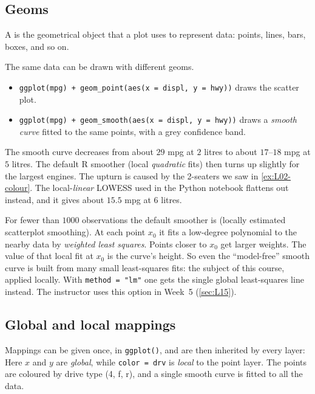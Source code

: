\subsection{Geoms}
\begin{definition}[Geom]\label{def:L03-geom}
A  is the geometrical object that a plot uses to represent data: points, lines,
bars, boxes, and so on.
\end{definition}
The same data can be drawn with different geoms.
\begin{itemize}
  \item \texttt{ggplot(mpg) + geom\_point(aes(x = displ, y = hwy))} draws the scatter plot.
  \item \texttt{ggplot(mpg) + geom\_smooth(aes(x = displ, y = hwy))} draws a \emph{smooth curve} fitted to the same points, with a grey confidence band.
\end{itemize}
The smooth curve decreases from about $29$ mpg at $2$ litres to about $17$--$18$ mpg at
$5$ litres. The default R smoother (local \emph{quadratic} fits) then turns up slightly for the
largest engines. The upturn is caused by the 2-seaters we saw in \cref{ex:L02-colour}. The
local-\emph{linear} LOWESS used in the Python notebook flattens out instead, and it gives
about $15.5$ mpg at $6$ litres.

\begin{note}
For fewer than $1000$ observations the default smoother is  (locally estimated
scatterplot smoothing). At each point $x_0$ it fits a low-degree polynomial to the nearby data
by \emph{weighted least squares}. Points closer to $x_0$ get larger weights. The value of that
local fit at $x_0$ is the curve's height. So even the ``model-free'' smooth curve is built from
many small least-squares fits: the subject of this course, applied locally. With
\texttt{method = "lm"} one gets the single global least-squares line instead. The instructor
uses this option in Week~5 (\cref{sec:L15}).
\end{note}

\subsection{Global and local mappings}
Mappings can be given once, in \texttt{ggplot()}, and are then inherited by every layer:
Here $x$ and $y$ are \emph{global}, while \texttt{color = drv} is \emph{local} to the point
layer. The points are coloured by drive type (4, f, r), and a single smooth curve is fitted to
all the data.

